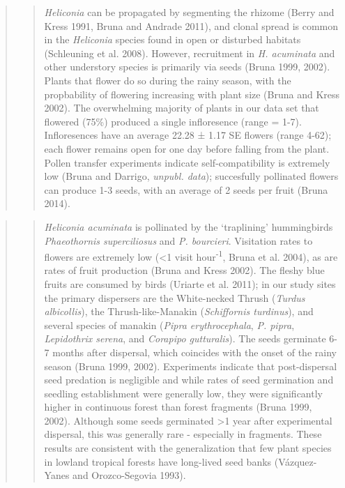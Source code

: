 \documentclass[
  12pt,
  man, donotrepeattitle,floatsintext]{apa6}
\begin{document}
\begin{quote}
\begin{quote}
\emph{Heliconia} can be propagated by segmenting the rhizome (Berry and Kress 1991, Bruna and Andrade 2011), and clonal spread is common in the \emph{Heliconia} species found in open or disturbed habitats (Schleuning et al. 2008). However, recruitment in \emph{H. acuminata} and other understory species is primarily via seeds (Bruna 1999, 2002). Plants that flower do so during the rainy season, with the propbability of flowering increasing with plant size (Bruna and Kress 2002). The overwhelming majority of plants in our data set that flowered (75\%) produced a single infloresence (range = 1-7). Infloresences have an average 22.28 ± 1.17 SE flowers (range 4-62); each flower remains open for one day before falling from the plant. Pollen transfer experiments indicate self-compatibility is extremely low (Bruna and Darrigo, \emph{unpubl. data}); succesfully pollinated flowers can produce 1-3 seeds, with an average of 2 seeds per fruit (Bruna 2014).
\end{quote}
\end{quote}

\begin{quote}
\begin{quote}
\emph{Heliconia acuminata} is pollinated by the `traplining' hummingbirds \emph{Phaeothornis superciliosus} and \emph{P. bourcieri}. Visitation rates to flowers are extremely low (\textless1 visit hour\textsuperscript{-1}, Bruna et al. 2004), as are rates of fruit production (Bruna and Kress 2002). The fleshy blue fruits are consumed by birds (Uriarte et al. 2011); in our study sites the primary dispersers are the White-necked Thrush (\emph{Turdus albicollis}), the Thrush-like-Manakin (\emph{Schiffornis turdinus}), and several species of manakin (\emph{Pipra erythrocephala}, \emph{P. pipra}, \emph{Lepidothrix serena}, and \emph{Corapipo gutturalis}). The seeds germinate 6-7 months after dispersal, which coincides with the onset of the rainy season (Bruna 1999, 2002). Experiments indicate that post-dispersal seed predation is negligible and while rates of seed germination and seedling establishment were generally low, they were significantly higher in continuous forest than forest fragments (Bruna 1999, 2002). Although some seeds germinated \textgreater1 year after experimental dispersal, this was generally rare - especially in fragments. These results are consistent with the generalization that few plant species in lowland tropical forests have long-lived seed banks (Vázquez-Yanes and Orozco-Segovia 1993).
\end{quote}
\end{quote}
\end{document}
